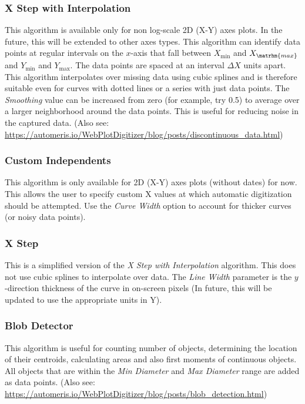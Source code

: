 \documentclass[letterpaper, 11pt]{article}
\begin{document}
\subsubsection{X Step with Interpolation}
This algorithm is available only for non log-scale 2D (X-Y) axes plots. In the future, this will be extended to other axes types. This algorithm can identify data points at regular intervals on the $x$-axis that fall between $X_{\mathrm{min}}$ and $X_{\matrhm{max}}$ and $Y_{\mathrm{min}}$ and $Y_{\mathrm{max}}$. The data points are spaced at an interval $\Delta X$ units apart. This algorithm interpolates over missing data using cubic splines and is therefore suitable even for curves with dotted lines or a series with just data points. The \emph{Smoothing} value can be increased from zero (for example, try 0.5) to average over a larger neighborhood around the data points. This is useful for reducing noise in the captured data. (Also see: \url{https://automeris.io/WebPlotDigitizer/blog/posts/discontinuous_data.html})

\subsubsection{Custom Independents}
This algorithm is only available for 2D (X-Y) axes plots (without dates) for now. This allows the user to specify custom X values at which automatic digitization should be attempted. Use the \emph{Curve Width} option to account for thicker curves (or noisy data points).

\subsubsection{X Step}
This is a simplified version of the \emph{X Step with Interpolation} algorithm. This does not use cubic splines to interpolate over data. The \emph{Line Width} parameter is the $y$-direction thickness of the curve in on-screen pixels (In future, this will be updated to use the appropriate units in Y). 

\subsubsection{Blob Detector}
This algorithm is useful for counting number of objects, determining the location of their centroids, calculating areas and also first moments of continuous objects. All objects that are within the \emph{Min Diameter} and \emph{Max Diameter} range are added as data points. (Also see: \url{https://automeris.io/WebPlotDigitizer/blog/posts/blob_detection.html})
\end{document}

